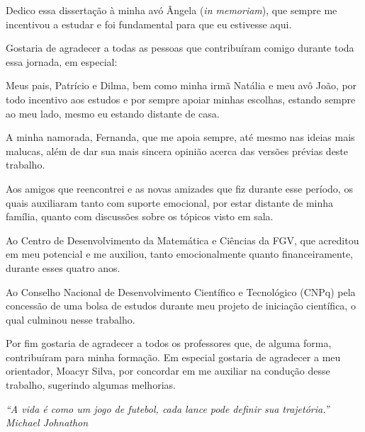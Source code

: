 \begin{dedicatoria}
    \vspace*{\fill}
    \hfill
    \begin{minipage}{.6\textwidth}
    Dedico essa dissertação à minha avó Ângela (\textit{in memoriam}), que sempre me incentivou a estudar e foi fundamental para que eu estivesse aqui.
    \end{minipage}
\end{dedicatoria}
 
\begin{agradecimentos}
    Gostaria de agradecer a todas as pessoas que contribuíram comigo durante toda essa jornada, em especial:
    
    Meus pais, Patrício e Dilma, bem como minha irmã Natália e meu avô João, por todo incentivo aos estudos e por sempre apoiar minhas escolhas, estando sempre ao meu lado, mesmo eu estando distante de casa.
    
    A minha namorada, Fernanda, que me apoia sempre, até mesmo nas ideias mais malucas, além de dar sua mais sincera opinião acerca das versões prévias deste trabalho.
    
    Aos amigos que reencontrei e as novas amizades que fiz durante esse período, os quais auxiliaram tanto com suporte emocional, por estar distante de minha família, quanto com discussões sobre os tópicos visto em sala.
    
    Ao Centro de Desenvolvimento da Matemática e Ciências da FGV, que acreditou em meu potencial e me auxiliou, tanto emocionalmente quanto financeiramente, durante esses quatro anos.
    
    Ao Conselho Nacional de Desenvolvimento Científico e Tecnológico (CNPq) pela concessão de uma bolsa de estudos durante meu projeto de iniciação científica, o qual culminou nesse trabalho.
    
    Por fim gostaria de agradecer a todos os professores que, de alguma forma, contribuíram para minha formação. Em especial gostaria de agradecer a meu orientador, Moacyr Silva, por concordar em me auxiliar na condução desse trabalho, sugerindo algumas melhorias.
\end{agradecimentos}

\begin{epigrafe}
\vspace*{\fill}

\begin{flushright}
    \hspace{7.5cm}
    \textit{
        ``A vida é como um jogo de futebol, cada lance pode definir sua trajetória.''} \\
        \textit{Michael Johnathon}
\end{flushright}
\end{epigrafe}